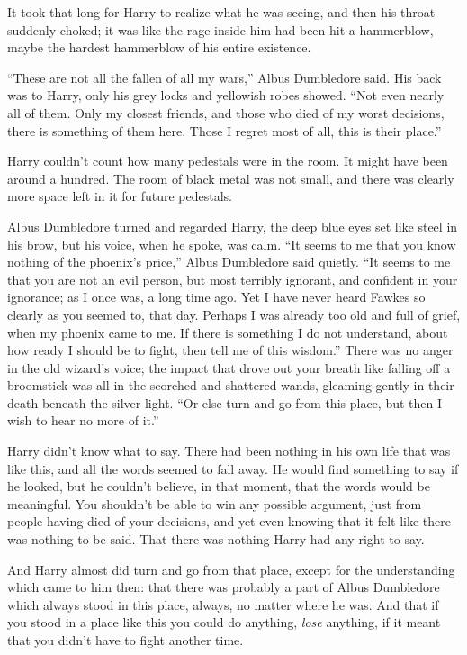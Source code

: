 It took that long for Harry to realize what he was seeing, and then his
throat suddenly choked; it was like the rage inside him had been hit a
hammerblow, maybe the hardest hammerblow of his entire existence.

``These are not all the fallen of all my wars,'' Albus Dumbledore said.
His back was to Harry, only his grey locks and yellowish robes showed.
``Not even nearly all of them. Only my closest friends, and those who
died of my worst decisions, there is something of them here. Those I
regret most of all, this is their place.''

Harry couldn't count how many pedestals were in the room. It might have
been around a hundred. The room of black metal was not small, and there
was clearly more space left in it for future pedestals.

Albus Dumbledore turned and regarded Harry, the deep blue eyes set like
steel in his brow, but his voice, when he spoke, was calm. ``It seems to
me that you know nothing of the phoenix's price,'' Albus Dumbledore said
quietly. ``It seems to me that you are not an evil person, but most
terribly ignorant, and confident in your ignorance; as I once was, a
long time ago. Yet I have never heard Fawkes so clearly as you seemed
to, that day. Perhaps I was already too old and full of grief, when my
phoenix came to me. If there is something I do not understand, about how
ready I should be to fight, then tell me of this wisdom.'' There was no
anger in the old wizard's voice; the impact that drove out your breath
like falling off a broomstick was all in the scorched and shattered
wands, gleaming gently in their death beneath the silver light. ``Or
else turn and go from this place, but then I wish to hear no more of
it.''

Harry didn't know what to say. There had been nothing in his own life
that was like this, and all the words seemed to fall away. He would find
something to say if he looked, but he couldn't believe, in that moment,
that the words would be meaningful. You shouldn't be able to win any
possible argument, just from people having died of your decisions, and
yet even knowing that it felt like there was nothing to be said. That
there was nothing Harry had any right to say.

And Harry almost did turn and go from that place, except for the
understanding which came to him then: that there was probably a part of
Albus Dumbledore which always stood in this place, always, no matter
where he was. And that if you stood in a place like this you could do
anything, \emph{lose} anything, if it meant that you didn't have to
fight another time.

